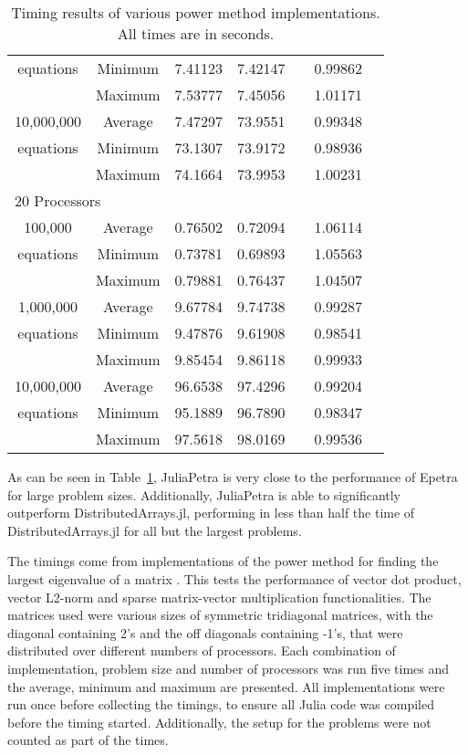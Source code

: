 \documentclass[acmsmall]{acmart}
\begin{document}
\begin{table}
\begin{tabular}{|c c|r|r|r||r|r|}
			equations		&Minimum & 7.41123 & 7.42147 &  & 0.99862 &  \\
							&Maximum & 7.53777 & 7.45056 &  & 1.01171 &  \\
		\hline
			10,000,000		&Average & 7.47297 & 73.9551 &  & 0.99348 &  \\
			equations		&Minimum & 73.1307 & 73.9172 &  & 0.98936 &  \\
							&Maximum & 74.1664 & 73.9953 &  & 1.00231 &  \\
		\hline
				\multicolumn{7}{|l|}{20 Processors}\\
		\hline
			100,000			&Average & 0.76502 & 0.72094 &  & 1.06114 &  \\
			equations		&Minimum & 0.73781 & 0.69893 &  & 1.05563 &  \\
							&Maximum & 0.79881 & 0.76437 &  & 1.04507 &  \\
		\hline
			1,000,000		&Average & 9.67784 & 9.74738 &  & 0.99287 &  \\
			equations		&Minimum & 9.47876 & 9.61908 &  & 0.98541 &  \\
							&Maximum & 9.85454 & 9.86118 &  & 0.99933 &  \\
		\hline
			10,000,000		&Average & 96.6538 & 97.4296 &  & 0.99204 &  \\
			equations		&Minimum & 95.1889 & 96.7890 &  & 0.98347 &  \\
							&Maximum & 97.5618 & 98.0169 &  & 0.99536 &  \\
		\hline
	\end{tabular}
	
	\caption{Timing results of various power method implementations.  All times are in seconds.}
	\label{tab:timing-results}
\end{table}

As can be seen in Table~\ref{tab:timing-results}, JuliaPetra is very close to the performance
of Epetra for large problem sizes.
Additionally, JuliaPetra is able to significantly outperform DistributedArrays.jl, performing in less than
half the time of DistributedArrays.jl for all but the largest problems.

The timings come from implementations of the power method for finding the largest eigenvalue of a matrix
\cite{Gu:2000:PowerMethod}.
This tests the performance of vector dot product, vector L2-norm and sparse matrix-vector multiplication functionalities.
The matrices used were various sizes of symmetric tridiagonal matrices, with the diagonal containing 2's
and the off diagonals containing -1's, that were distributed over different numbers of processors.
Each combination of implementation, problem size and number of processors was run five times
and the average, minimum and maximum are presented.
All implementations were run once before collecting the timings, to ensure all Julia code was
compiled before the timing started.
Additionally, the setup for the problems were not counted as part of the times.
\end{document}
